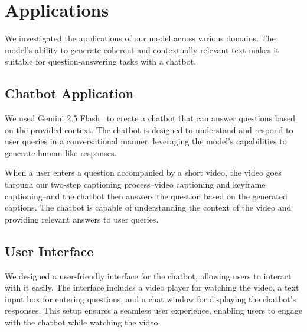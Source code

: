 \section{Applications}

We investigated the applications of our model across various domains. The model's ability to generate coherent and contextually relevant text makes it suitable for question-answering tasks with a chatbot.



\subsection{Chatbot Application}

We used Gemini 2.5 Flash~\cite{comanici2025gemini} to create a chatbot that can answer questions based on the provided context. The chatbot is designed to understand and respond to user queries in a conversational manner, leveraging the model's capabilities to generate human-like responses.

When a user enters a question accompanied by a short video, the video goes through our two-step captioning process--video captioning and keyframe captioning--and the chatbot then answers the question based on the generated captions. The chatbot is capable of understanding the context of the video and providing relevant answers to user queries.

\subsection{User Interface}

We designed a user-friendly interface for the chatbot, allowing users to interact with it easily. The interface includes a video player for watching the video, a text input box for entering questions, and a chat window for displaying the chatbot's responses. This setup ensures a seamless user experience, enabling users to engage with the chatbot while watching the video.

